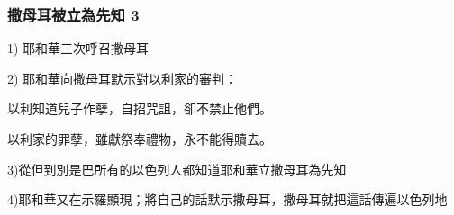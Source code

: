 \documentclass{ctexart}
\begin{document}
\subsubsection{撒母耳被立為先知 3}
\begin{description}\itemsep-20pt
\item 1) 耶和華三次呼召撒母耳
\item 2) 耶和華向撒母耳默示對以利家的審判：
\begin{description}\itemsep-20pt
\item 以利知道兒子作孽，自招咒詛，卻不禁止他們。
\item 以利家的罪孽，雖獻祭奉禮物，永不能得贖去。
\end{description}
\item 3)從但到別是巴所有的以色列人都知道耶和華立撒母耳為先知
\item 4)耶和華又在示羅顯現；將自己的話默示撒母耳，撒母耳就把這話傳遍以色列地
\end{description}
\end{document}
